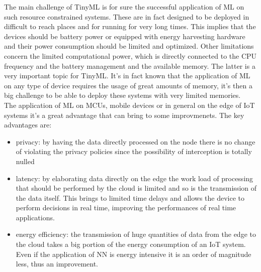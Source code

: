\documentclass[12pt]{report}
\begin{document}
The main challenge of TinyML is for sure the successful application of ML on such resource constrained systems. These are in fact designed to be deployed in difficult to reach places and for running for very long times. This implies that the devices should be battery power or equipped with energy harvesting hardware and their power consumption should be limited and optimized. Other limitations concern the limited computational power, which is directly connected to the CPU frequency and the battery management and the available memory. The latter is a very important topic for TinyML. It's in fact known that the application of ML on any type of device requires the usage of great amounts of memory, it's then a big challenge to be able to deploy these systems with very limited memories.\\
The application of ML on MCUs, mobile devices or in general on the edge of IoT systems it's a great advantage that can bring to some improvmenets. The key advantages are:
\begin{itemize}
\item privacy: by having the data directly processed on the node there is no change of violating the privacy policies since the possibility of interception is totally nulled
\item latency: by elaborating data directly on the edge the work load of processing that should be performed by the cloud is limited and so is the transmission of the data itself. This brings to limited time delays and allows the device to perform decisions in real time, improving the performances of real time applications.
\item energy efficiency: the transmission of huge quantities of data from the edge to the cloud takes a big portion of the energy consumption of an IoT system. Even if the application of NN is energy intensive it is an order of magnitude less, thus an improvement.
\end{itemize}
\end{document}
